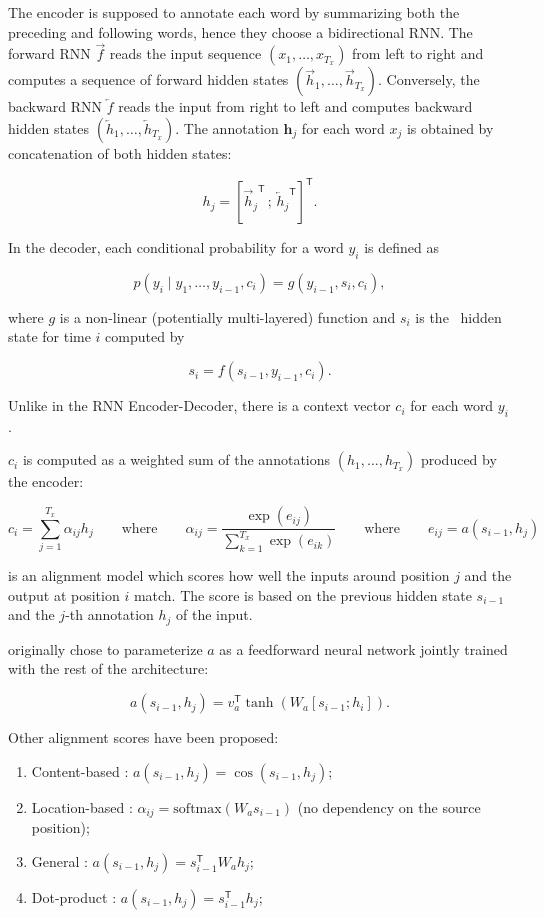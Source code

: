 The encoder is supposed to annotate each word by summarizing both the preceding and following words, hence they choose a bidirectional RNN. The forward RNN $\overrightarrow{f}$ reads the input sequence $(x_1, \dots, x_{T_x})$ from left to right and computes a sequence of forward hidden states $(\overrightarrow{h}_1, \dots, \overrightarrow{h}_{T_x})$. Conversely, the backward RNN $\overleftarrow{f}$ reads the input from right to left and computes backward hidden states $(\overleftarrow{h}_1, \dots, \overleftarrow{h}_{T_x})$. The annotation $\mathbf{h}_j$ for each word $x_j$ is obtained by concatenation of both hidden states:

\[ h_j = \left[ {\overrightarrow{h}_j}^\mathsf{T} \, ; \, {\overleftarrow{h}_j}^\mathsf{T} \right]^\mathsf{T} . \]

In the decoder, each conditional probability for a word $y_i$ is defined as

\[ p\left(y_i \mid y_1, \dots, y_{i-1}, c_i \right) = g\left(y_{i-1}, s_i, c_i \right) , \]

where $g$ is a non-linear (potentially multi-layered) function and $s_i$ is the \rnn\ hidden state for time $i$ computed by

\[ s_i = f\left(s_{i-1}, y_{i-1}, c_i\right) . \]

Unlike in the RNN Encoder-Decoder, there is a context vector $c_i$ for each word $y_i$.

$c_i$ is computed as a weighted sum of the annotations $(h_1, \dots, h_{T_x})$ produced by the encoder:

\[ c_i = \sum_{j=1}^{T_x} \alpha_{ij} h_j \qquad \text{where} \qquad \alpha_{ij} = \frac{\exp(e_{ij})}{\sum_{k=1}^{T_x} \exp(e_{ik})} \qquad \text{where} \qquad e_{ij} = a(s_{i-1}, h_j) \]

is an alignment model which scores how well the inputs around position $j$ and the output at position $i$ match. The score is based on the previous hidden state $s_{i-1}$ and the $j$-th annotation $h_j$ of the input.

\citet{bahdanau2014neural} originally chose to parameterize $a$ as a feedforward neural network jointly trained with the rest of the architecture:

\[ a(s_{i-1}, h_j) = v_a^\mathsf{T} \tanh \left(W_a [s_{i-1} ; h_i] \right) . \]

Other alignment scores have been proposed:
\begin{enumerate}[nolistsep]
    \item Content-based \citep{graves2014neural}: $a(s_{i-1}, h_j) = \cos(s_{i-1}, h_j)$;
    \item Location-based \citep{luong2015effective}: $\alpha_{ij} = \mathrm{softmax}(W_a s_{i-1})$ (no dependency on the source position);
    \item General \citep{luong2015effective}: $a(s_{i-1}, h_j) = s_{i-1}^\mathsf{T} W_a h_j$;
    \item Dot-product \citep{luong2015effective}: $a(s_{i-1}, h_j) = s_{i-1}^\mathsf{T} h_j$;
\end{enumerate}

